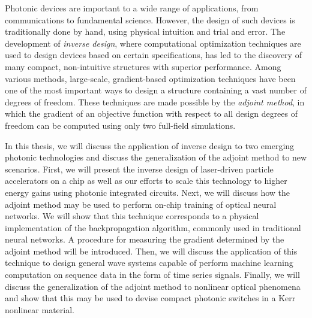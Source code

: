 Photonic devices are important to a wide range of applications, from communications to fundamental science.  However, the design of such devices is traditionally done by hand, using physical intuition and trial and error.  The development of \textit{inverse design}, where computational optimization techniques are used to design devices based on certain specifications, has led to the discovery of many compact, non-intuitive structures with superior performance. Among various methods, large-scale, gradient-based optimization techniques have been one of the most important ways to design a structure containing a vast number of degrees of freedom. These techniques are made possible by the \textit{adjoint method}, in which the gradient of an objective function with respect to all design degrees of freedom can be computed using only two full-field simulations.

In this thesis, we will discuss the application of inverse design to two emerging photonic technologies and discuss the generalization of the adjoint method to new scenarios.   First, we will present the inverse design of laser-driven particle accelerators on a chip as well as our efforts to scale this technology to higher energy gains using photonic integrated circuits.  Next, we will discuss how the adjoint method may be used to perform on-chip training of optical neural networks.  We will show that this technique corresponds to a physical implementation of the backpropagation algorithm, commonly used in traditional neural networks.  A procedure for measuring the gradient determined by the adjoint method will be introduced.  Then, we will discuss the application of this technique to design general wave systems capable of perform machine learning computation on sequence data in the form of time series signals.  Finally, we will discuss the generalization of the adjoint method to nonlinear optical phenomena and show that this may be used to devise compact photonic switches in a Kerr nonlinear material.
